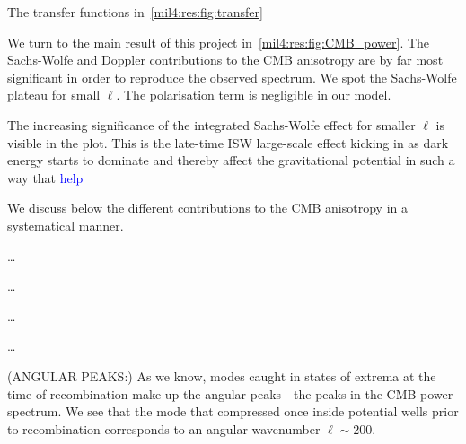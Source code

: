 


The transfer functions in~\cref{mil4:res:fig:transfer} 



We turn to the main result of this project in~\cref{mil4:res:fig:CMB_power}. The Sachs-Wolfe and Doppler contributions to the CMB anisotropy are by far most significant in order to reproduce the observed spectrum. We spot the Sachs-Wolfe plateau for small $\ell$. The polarisation term is negligible in our model. 

The increasing significance of the integrated Sachs-Wolfe effect for smaller $\ell$ is visible in the plot. This is the late-time ISW large-scale effect kicking in as dark energy starts to dominate and thereby affect the gravitational potential in such a way that \textcolor{blue}{help}


We discuss below the different contributions to the CMB anisotropy in a systematical manner.

\dots

\dots 

\dots 

\dots

(ANGULAR PEAKS:) As we know, modes caught in states of extrema at the time of recombination make up the angular peaks---the peaks in the CMB power spectrum. We see that the mode that compressed once inside potential wells prior to recombination corresponds to an angular wavenumber $\ell\sim 200$. 